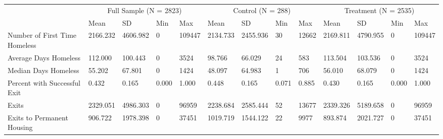 \begin{tabular}{lllllllllllll}
\toprule
 & \multicolumn{4}{c}{Full Sample (N = 2823)} & \multicolumn{4}{c}{Control (N = 288)} & \multicolumn{4}{c}{Treatment (N = 2535)} \\
 & Mean & SD & Min & Max & Mean & SD & Min & Max & Mean & SD & Min & Max \\
\midrule
Number of First Time Homeless & 2166.232 & 4606.982 & 0 & 109447 & 2134.733 & 2455.936 & 30 & 12662 & 2169.811 & 4790.955 & 0 & 109447 \\
Average Days Homeless & 112.000 & 100.443 & 0 & 3524 & 98.766 & 66.029 & 24 & 583 & 113.504 & 103.536 & 0 & 3524 \\
Median Days Homeless & 55.202 & 67.801 & 0 & 1424 & 48.097 & 64.983 & 1 & 706 & 56.010 & 68.079 & 0 & 1424 \\
Percent with Successful Exit & 0.432 & 0.165 & 0.000 & 1.000 & 0.448 & 0.165 & 0.071 & 0.885 & 0.430 & 0.165 & 0.000 & 1.000 \\
Exits & 2329.051 & 4986.303 & 0 & 96959 & 2238.684 & 2585.444 & 52 & 13677 & 2339.326 & 5189.658 & 0 & 96959 \\
Exits to Permanent Housing & 906.722 & 1978.398 & 0 & 37451 & 1019.719 & 1544.122 & 22 & 9977 & 893.874 & 2021.727 & 0 & 37451 \\
\bottomrule
\end{tabular}
